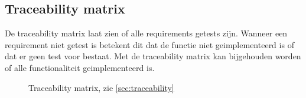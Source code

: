 \subsection{Traceability matrix} \label{sec:traceability}
De traceability matrix laat zien of alle requirements getests zijn. Wanneer een requirement niet getest is betekent dit dat de functie niet geimplementeerd is of dat er geen test voor bestaat. Met de traceability matrix kan bijgehouden worden of alle functionaliteit geimplementeerd is.

\begin{figure}
\begin{center}
\resizebox{\linewidth}{!}{}
\caption{Traceability matrix, zie \autoref{sec:traceability}}
\label{fig:traceability}
\end{center}
\end{figure}





